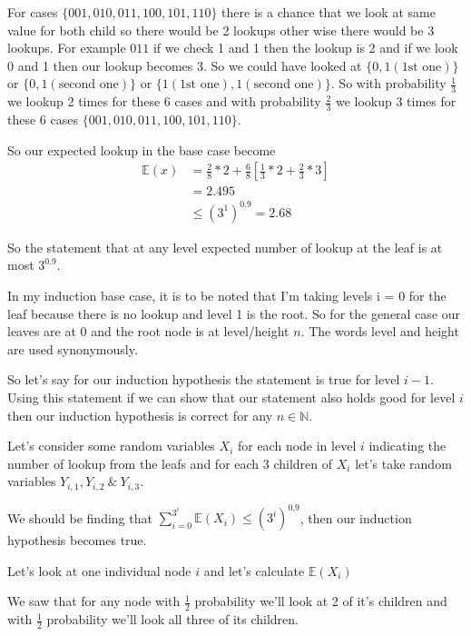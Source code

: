 \documentclass[addpoints,12pt]{exam}
\begin{document}
\begin{questions}
\begin{solution}
            For cases $\{001,010,011, 100,101,110\}$ there is a chance that we look at same value for both child so there would be 2 lookups other wise there would be 3 lookups. For example $011$ if we check 1 and 1 then the lookup is 2 and if we look 0 and 1 then our lookup becomes 3. So we could have looked at $\{0, 1(\text{1st one})\}$ or $\{0, 1(\text{second one})\}$ or $\{1(\text{1st one}), 1(\text{second one})\}$. So with probability $\frac{1}{3}$ we lookup 2 times for these 6 cases and with probability $\frac{2}{3}$ we lookup 3 times for these 6 cases $\{001,010,011, 100,101,110\}$.

            So our expected lookup in the base case become
            \begin{align}
                \mathbb{E}(x) &= \frac{2}{8} * 2 + \frac{6}{8} \left[\frac{1}{3}* 2 + \frac{2}{3} * 3\right]\\
                &=2.495\\
                &\leq (3^1)^{0.9} = 2.68
            \end{align}

            So the statement that at any level expected number of lookup at the leaf is at most $3^{0.9}$.

            In my induction base case, it is to be noted that I'm taking levels i = 0 for the leaf because there is no lookup and level 1 is the root. So for the general case our leaves are at $0$ and the root node is at level/height $n$. The words level and height are used synonymously.

            So let's say for our induction hypothesis the statement is true for level $i - 1$. Using this statement if we can show that our statement also holds good for level $i$ then our induction hypothesis is correct for any $n \in \mathbb{N}$.

            Let's consider some random variables $X_i$ for each node in level $i$ indicating the number of lookup from the leafs and for each 3 children of $X_i$ let's take random variables $Y_{i, 1}, Y_{i, 2} \:\&\: Y_{i, 3}$.

            We should be finding that $\displaystyle\sum_{i=0}^{3^{i}} \mathbb{E}(X_i) \leq (3^i)^{0.9}$, then our induction hypothesis becomes true.

            Let's look at one individual node $i$ and let's calculate $\mathbb{E}(X_i)$

            We saw that for any node with $\frac{1}{2}$ probability we'll look at 2 of it's children and with $\frac{1}{2}$ probability we'll look all three of its children.
            

\end{solution}
\end{questions}
\end{document}
